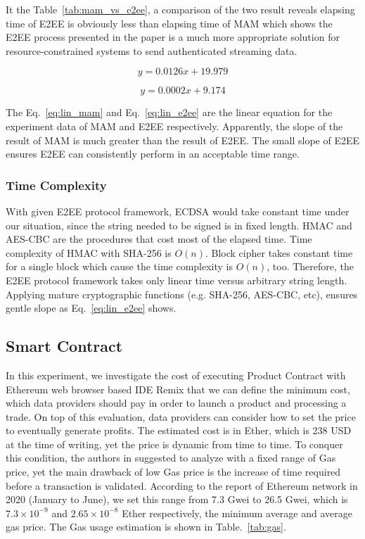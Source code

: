 \documentclass[conference]{IEEEtran}
\begin{document}
It the Table~\ref{tab:mam_vs_e2ee}, a comparison of the two result reveals elapsing time of E2EE is obviously less than elapsing time of MAM which shows the E2EE process presented in the paper is a much more appropriate solution for resource-constrained systems to send authenticated streaming data.

\begin{equation}
    \label{eq:lin_mam}
    y=0.0126 x+19.979  
\end{equation}

\begin{equation}
    \label{eq:lin_e2ee}
    y=0.0002 x+9.174
\end{equation}

The Eq.~\ref{eq:lin_mam} and Eq.~\ref{eq:lin_e2ee} are the linear equation for the experiment data of MAM and E2EE respectively. Apparently, the slope of the result of MAM is much greater than the result of E2EE. The small slope of E2EE ensures E2EE can consistently perform in an acceptable time range.

\subsubsection{Time Complexity}
With given E2EE protocol framework, ECDSA would take constant time under our situation, since the string needed to be signed is in fixed length. HMAC and AES-CBC are the procedures that cost most of the elapsed time. Time complexity of HMAC with SHA-256 is $O(n)$.\cite{hmac_time_complexity} Block cipher takes constant time for a single block which cause the time complexity is $O(n)$, too. Therefore, the E2EE protocol framework takes only linear time versus arbitrary string length. Applying mature cryptographic functions (e.g. SHA-256, AES-CBC, etc), ensures gentle slope as Eq.~\ref{eq:lin_e2ee} shows.

\subsection{Smart Contract}
In this experiment, we investigate the cost of executing Product Contract with Ethereum web browser based IDE Remix that we can define the minimum cost, which data providers should pay in order to launch a product and processing a trade.  On top of this evaluation, data providers can consider how to set the price to eventually generate profits. The estimated cost is in Ether, which is 238 USD at the time of writing, yet the price is dynamic from time to time. To conquer this condition, the authors in \cite{MindMyValue} suggested to analyze with a fixed range of Gas price,  yet the main drawback of low Gas price is the increase of time required before a transaction is validated. According to the report of Ethereum network\cite{ethereumChart} in 2020 (January to June), we set this range from 7.3 Gwei to 26.5 Gwei, which is $7.3 \times 10^{-9}$ and $2.65 \times 10^{-8}$ Ether respectively, the minimum average and average gas price. The Gas usage estimation is shown in Table.~\ref{tab:gas}.
\end{document}

